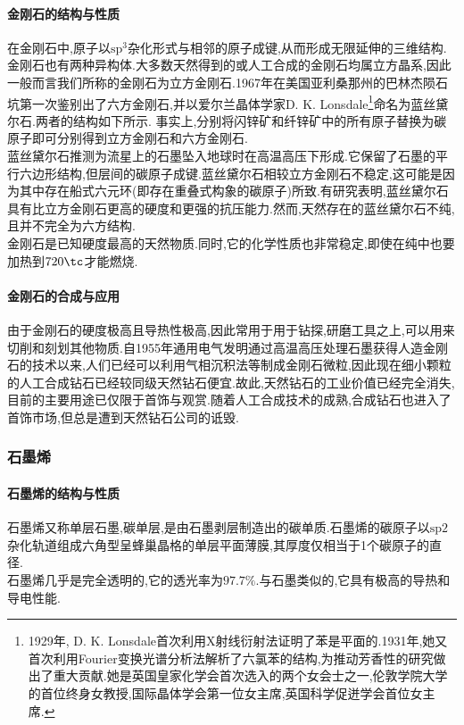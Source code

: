 \documentclass{ctexart}
\begin{document}
\paragraph{金刚石的结构与性质}
在金刚石中,原子以$\text{sp}^3$杂化形式与相邻的原子成键,从而形成无限延伸的三维结构.金刚石也有两种异构体.大多数天然得到的或人工合成的金刚石均属立方晶系,因此一般而言我们所称的金刚石为立方金刚石.1967年在美国亚利桑那州的巴林杰陨石坑第一次鉴别出了六方金刚石,并以爱尔兰晶体学家D. K. Lonsdale\footnote{1929年, D. K. Lonsdale首次利用X射线衍射法证明了苯是平面的.1931年,她又首次利用Fourier变换光谱分析法解析了六氯苯的结构,为推动芳香性的研究做出了重大贡献.她是英国皇家化学会首次选入的两个女会士之一,伦敦学院大学的首位终身女教授,国际晶体学会第一位女主席,英国科学促迸学会首位女主席.}命名为蓝丝黛尔石.两者的结构如下所示.
事实上,分别将闪锌矿和纤锌矿中的所有原子替换为碳原子即可分别得到立方金刚石和六方金刚石.\\
\indent 蓝丝黛尔石推测为流星上的石墨坠入地球时在高温高压下形成.它保留了石墨的平行六边形结构,但层间的碳原子成键.蓝丝黛尔石相较立方金刚石不稳定,这可能是因为其中存在船式六元环(即存在重叠式构象的碳原子)所致.有研究表明,蓝丝黛尔石具有比立方金刚石更高的硬度和更强的抗压能力.然而,天然存在的蓝丝黛尔石不纯,且并不完全为六方结构.\\
\indent 金刚石是已知硬度最高的天然物质.同时,它的化学性质也非常稳定,即使在纯中也要加热到$720\tc$才能燃烧.
\paragraph{金刚石的合成与应用}
由于金刚石的硬度极高且导热性极高,因此常用于用于钻探,研磨工具之上,可以用来切削和刻划其他物质.自1955年通用电气发明通过高温高压处理石墨获得人造金刚石的技术以来,人们已经可以利用气相沉积法等制成金刚石微粒,因此现在细小颗粒的人工合成钻石已经较同级天然钻石便宜.故此,天然钻石的工业价值已经完全消失,目前的主要用途已仅限于首饰与观赏.随着人工合成技术的成熟,合成钻石也进入了首饰市场,但总是遭到天然钻石公司的诋毁.
\subsubsection{石墨烯}
\paragraph{石墨烯的结构与性质}
石墨烯又称单层石墨,碳单层,是由石墨剥层制造出的碳单质.石墨烯的碳原子以$\text{sp}2$杂化轨道组成六角型呈蜂巢晶格的单层平面薄膜,其厚度仅相当于1个碳原子的直径.\\
\indent 石墨烯几乎是完全透明的,它的透光率为$97.7\%$.与石墨类似的,它具有极高的导热和导电性能.
\end{document}
